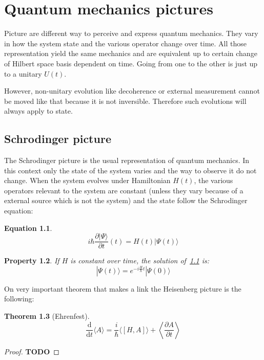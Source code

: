\documentclass[10pt]{report}
\theoremstyle{plain}
\newtheorem{thm}{Theorem}[chapter]
\newtheorem{prop}[thm]{Property}
\theoremstyle{definition}
\newtheorem{eqn}[thm]{Equation}
\theoremstyle{remark}
\newcommand{\TODO}{\textbf{TODO}}
\newcommand{\ket}[1]{|#1\rangle}
\newcommand{\dd}{\mathrm{d}}
\newcommand{\der}[2]{\frac{\dd{#1}}{\dd{#2}}}
\newcommand{\dpar}[2]{\frac{\partial{#1}}{\partial{#2}}}
\begin{document}


{\let\clearpage\relax }


\appendix

\chapter{Quantum mechanics pictures}\label{app:pict}

Picture are different way to perceive and express quantum mechanics. They vary
in how the system state and the various operator change over time. All those
representation yield the same mechanics and are equivalent up to certain change
of Hilbert space basis dependent on time. Going from one to the other is just up
to a unitary $U(t)$.

However, non-unitary evolution like decoherence or external measurement
cannot be moved like that because it is not inversible. Therefore such
evolutions will always apply to state.

\section{Schrodinger picture}

The Schrodinger picture is the usual representation of quantum mechanics. In
this context only the state of the system varies and the way to observe it do
not change. When the system evolves under Hamiltonian $H(t)$,
the various operators relevant to the system are constant (unless they vary
because of a external source which is not the system) and the
state follow the Schrodinger equation:
\begin{eqn}\label{eqn:schro}
\[i\hbar \frac{\partial \ket \Psi}{\partial t} (t) = H(t) \ket {\Psi(t)} \]
\end{eqn}

\begin{prop}
  If $H$ is constant over time, the solution of~\cref{eqn:schro} is:
  \[ \ket {\Psi(t)} = e^{-i\frac H\hbar t}\ket{\Psi(0)}\]
\end{prop}

On very important theorem that makes a link the Heisenberg picture is the
following:

\begin{thm}[Ehrenfest]\label{thm:ehren}
  \[\der{}t\langle A\rangle = \frac i\hbar\langle[H,A]\rangle + \left\langle\dpar
      A t \right\rangle\]
\end{thm}

\begin{proof}
  \TODO
\end{proof}
\end{document}
